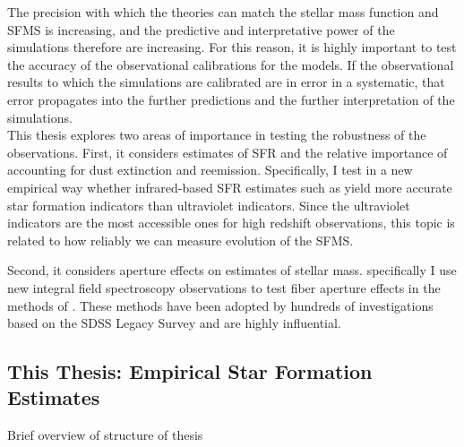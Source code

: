 The precision with which the theories can match the stellar mass
function and SFMS is increasing, and the predictive and interpretative
power of the simulations therefore are increasing. For this reason, it
is highly important to test the accuracy of the observational
calibrations for the models. If the observational results to which the
simulations are calibrated are in error in a systematic, that error
propagates into the further predictions and the further interpretation
of the simulations.\\

This thesis explores two areas of importance in testing the robustness
of the observations. First, it considers estimates of SFR and the
relative importance of accounting for dust extinction and reemission.
Specifically, I test in a new empirical way whether infrared-based SFR
estimates such as \citet{da_cunha} yield more accurate star formation
indicators than ultraviolet indicators. Since the ultraviolet
indicators are the most accessible ones for high redshift
observations, this topic is related to how reliably we can measure
evolution of the SFMS.

Second, it considers aperture effects on estimates of stellar mass.
specifically I use new integral field spectroscopy observations to
test fiber aperture effects in the methods of
\citet{kauffmann_stellar_2003}. These methods have been adopted by
hundreds of investigations based on the SDSS Legacy Survey and are
highly influential.

\subsection{This Thesis: Empirical Star Formation Estimates}
Brief overview of structure of thesis







